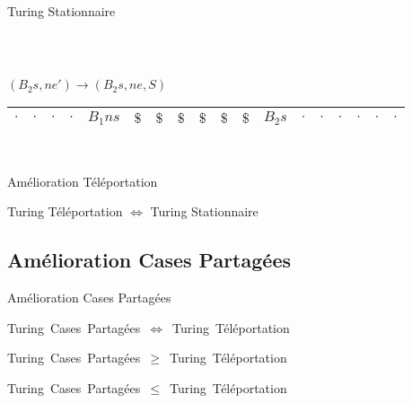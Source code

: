 \documentclass[12pt]{beamer}
\begin{document}
\begin{frame}{Turing Stationnaire}
\begin{center}
\begin{tabular}{|c|c|c|c|c|c|c|c|c|c|c|c|c|c|c|c|c|c|}
\end{tabular}\\

\pause
\pause
\pause
\pause
\pause
\pause

\vspace{0.5cm}

    $(B_2s,ne') \longrightarrow (B_2s, ne, S)$\\



    
\begin{tabular}{|c|c|c|c|c|c|c|c|c|c|c|c|c|c|c|c|c|c|}\hline
     $\cdot$ & $\cdot$ & $\cdot$ & $\cdot$ & $B_1ns$ & $\$$ & $\$$ & $\$$ & $\$$ & $\$$ & $\$$ & $B_2s$ & $\cdot$ & $\cdot$ & $\cdot$ & $\cdot$ & $\cdot$ & $\cdot$ \\\hline    
     
\end{tabular}\\

    \end{center}
\end{frame}

\begin{frame}{Amélioration Téléportation}
\begin{center}
    \begin{tcolorbox}[colframe=red, hbox]
    \large Turing Téléportation $\Longleftrightarrow$ Turing Stationnaire
\end{tcolorbox}
\end{center}

\end{frame}

\subsection{Amélioration Cases Partagées}
\begin{frame}{Amélioration Cases Partagées}
    \begin{center}
    \mbox{\large Turing Cases Partagées $\Longleftrightarrow$ Turing Téléportation}

    \pause

    \vspace{1cm}

    \mbox{\large Turing Cases Partagées $\geq$ Turing Téléportation}

    \pause

    \vspace{1cm}

    \mbox{\large Turing Cases Partagées $\leq$ Turing Téléportation}
    \end{center}
\end{frame}
\end{document}
